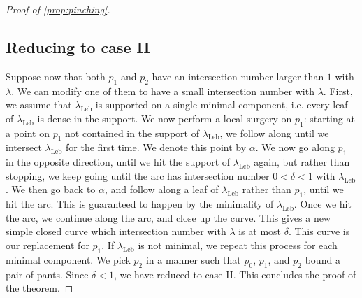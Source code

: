 \begin{proof}[Proof of \autoref{prop:pinching}]
\subsection*{Reducing to case II} Suppose now that both $p_1$ and $p_2$ have an intersection number larger than $1$ with $\lambda$.
We can modify one of them to have a small intersection number with $\lambda$.
First, we assume that $\lambda_{\mathrm{Leb}}$ is supported on a single minimal component, i.e. every leaf of $\lambda_{\mathrm{Leb}}$ is dense in the support.
We now perform a local surgery on $p_1$: starting at a point on $p_1$ not contained in the support of $\lambda_{\mathrm{Leb}}$, we follow along until we intersect $\lambda_{\mathrm{Leb}}$ for the first time.
We denote this point by $\alpha$.
We now go along $p_1$ in the opposite direction, until we hit the support of $\lambda_{\mathrm{Leb}}$ again, but rather than stopping, we keep going until the arc has intersection number $0 < \delta < 1$ with $\lambda_{\mathrm{Leb}}$.
We then go back to $\alpha$, and follow along a leaf of $\lambda_{\mathrm{Leb}}$ rather than $p_1$, until we hit the arc.
This is guaranteed to happen by the minimality of $\lambda_{\mathrm{Leb}}$.
Once we hit the arc, we continue along the arc, and close up the curve.
This gives a new simple closed curve which intersection number with $\lambda$ is at most $\delta$.
This curve is our replacement for $p_1$.
If $\lambda_{\mathrm{Leb}}$ is not minimal, we repeat this process for each minimal component. We pick $p_2$ in a manner such that $p_0$, $p_1$, and $p_2$ bound a pair of pants.
Since $\delta < 1$, we have reduced to case II.
This concludes the proof of the theorem.
\end{proof}

